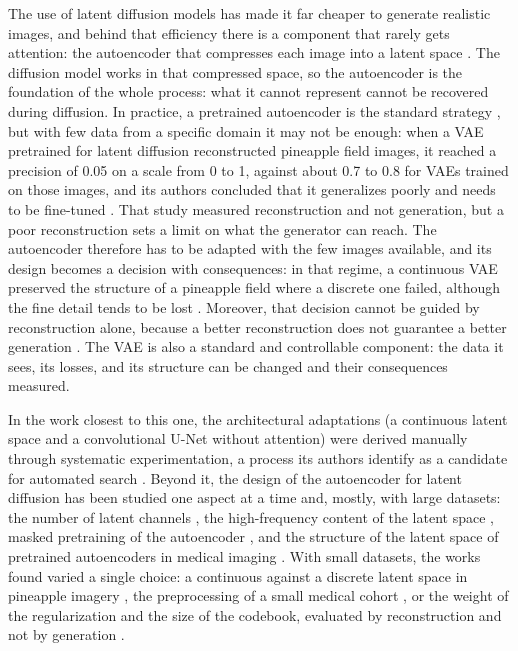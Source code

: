 The use of latent diffusion models has made it far cheaper to generate realistic images, and behind that efficiency there is a component that rarely gets attention: the autoencoder that compresses each image into a latent space \cite{Rombach2022}. The diffusion model works in that compressed space, so the autoencoder is the foundation of the whole process: what it cannot represent cannot be recovered during diffusion. In practice, a pretrained autoencoder is the standard strategy \cite{Zheng2025}, but with few data from a specific domain it may not be enough: when a VAE pretrained for latent diffusion reconstructed pineapple field images, it reached a precision of 0.05 on a scale from 0 to 1, against about 0.7 to 0.8 for VAEs trained on those images, and its authors concluded that it generalizes poorly and needs to be fine-tuned \cite{XieLi2025VAE}. That study measured reconstruction and not generation, but a poor reconstruction sets a limit on what the generator can reach. The autoencoder therefore has to be adapted with the few images available, and its design becomes a decision with consequences: in that regime, a continuous VAE preserved the structure of a pineapple field where a discrete one failed, although the fine detail tends to be lost \cite{Gonzalez2026}. Moreover, that decision cannot be guided by reconstruction alone, because a better reconstruction does not guarantee a better generation \cite{Yao2025,Zhong2026}. The VAE is also a standard and controllable component: the data it sees, its losses, and its structure can be changed and their consequences measured.

In the work closest to this one, the architectural adaptations (a continuous latent space and a convolutional U-Net without attention) were derived manually through systematic experimentation, a process its authors identify as a candidate for automated search \cite{Gonzalez2026}. Beyond it, the design of the autoencoder for latent diffusion has been studied one aspect at a time and, mostly, with large datasets: the number of latent channels \cite{Yao2025,Sehwag2025}, the high-frequency content of the latent space \cite{Skorokhodov2025}, masked pretraining of the autoencoder \cite{Chen2025,Lee2025LDMAE}, and the structure of the latent space of pretrained autoencoders in medical imaging \cite{Dombrowski2026}. With small datasets, the works found varied a single choice: a continuous against a discrete latent space in pineapple imagery \cite{Gonzalez2026}, the preprocessing of a small medical cohort \cite{Fallah2026}, or the weight of the regularization and the size of the codebook, evaluated by reconstruction and not by generation \cite{XieLi2025VAE}.

